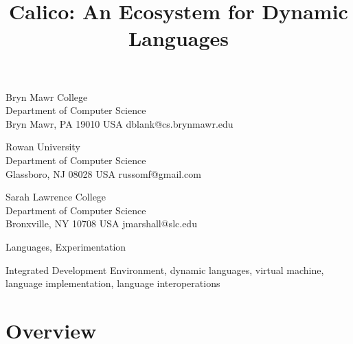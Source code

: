 \documentclass[preprint]{sigplanconf}
\begin{document}




\title{Calico: An Ecosystem for Dynamic Languages}

           {Bryn Mawr College\\Department of Computer Science\\Bryn Mawr, PA 19010 USA}
           {dblank@cs.brynmawr.edu}

           {Rowan University\\Department of Computer Science\\Glassboro, NJ 08028 USA}
           {russomf@gmail.com}

           {Sarah Lawrence College\\Department of Computer Science\\Bronxville, NY 10708 USA}
           {jmarshall@slc.edu}

\maketitle

\begin{abstract}

\end{abstract}




\terms
Languages, Experimentation

\keywords 
Integrated Development Environment, dynamic languages,
virtual machine, language implementation, language interoperations

\section{Overview}
\end{document}
